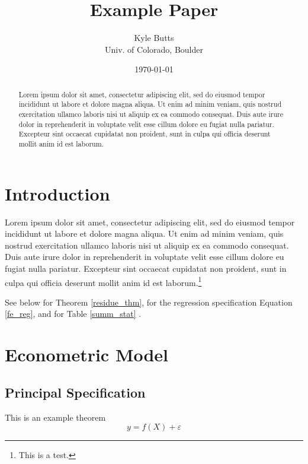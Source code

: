 \documentclass[11pt]{article}
\title{\color{navyblue} Example Paper}
\author{\normalsize Kyle Butts\\{\footnotesize Univ. of Colorado, Boulder}}
\date{\footnotesize\today}
\begin{document}
\maketitle
\begin{abstract}
    Lorem ipsum dolor sit amet, consectetur adipiscing elit, sed do eiusmod tempor incididunt ut labore et dolore magna aliqua. Ut enim ad minim veniam, quis nostrud exercitation ullamco laboris nisi ut aliquip ex ea commodo consequat. Duis aute irure dolor in reprehenderit in voluptate velit esse cillum dolore eu fugiat nulla pariatur. Excepteur sint occaecat cupidatat non proident, sunt in culpa qui officia deserunt mollit anim id est laborum.
\end{abstract}

\newpage

\section{Introduction}

Lorem ipsum dolor sit amet, consectetur adipiscing elit, sed do eiusmod tempor incididunt ut labore et dolore magna aliqua. Ut enim ad minim veniam, quis nostrud exercitation ullamco laboris nisi ut aliquip ex ea commodo consequat. Duis aute irure dolor in reprehenderit in voluptate velit esse cillum dolore eu fugiat nulla pariatur. Excepteur sint occaecat cupidatat non proident, sunt in culpa qui officia deserunt mollit anim id est laborum.\footnote{This is a test.}

See below for Theorem \ref{residue_thm}, for the regression specification Equation \ref{fe_reg}, and for Table \ref{summ_stat} \citep{Eigen1971}. 

\section{Econometric Model}

\subsection{Principal Specification}

\begin{theorem}\label{residue_thm}
    This is an example theorem \[ 
        y = f(X) + \varepsilon 
    \]
\end{theorem}
\end{document}

